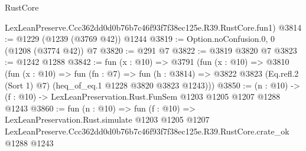 \begin{lexlean}{RustCore}
\begin{coremodule}
    LexLeanPreserve.Ccc362dd0d0b76b7c46f93f7f38ec125e.R39.RustCore.fun1)
@3814 := @1229 (@1239 (@3769 @42)) @1244
@3819 := Option.noConfusion.{0, 0} (@1208 (@3774 @42)) @7
@3820 := @291 @7
@3822 := @3819 @3820 @7
@3823 := @1242 @1288
@3842 := fun (x : @10) =>
  @3791
    (fun (x : @10) =>
    @3810
      (fun (x : @10) =>
      fun (fn : @7) =>
      fun (h : @3814) =>
      @3822 @3823 (Eq.refl.{2} (Sort 1) @7) (heq_of_eq.{1} @1228 @3820 @3823 @1243)))
@3850 := (n : @10) -> (f : @10) -> LexLeanPreservation.Rust.FunSem @1203 @1205 @1207 @1288 @1243
@3860 := fun (n : @10) =>
  fun (f : @10) =>
  LexLeanPreservation.Rust.simulate
    @1203
    @1205
    @1207
    LexLeanPreserve.Ccc362dd0d0b76b7c46f93f7f38ec125e.R39.RustCore.crate_ok
    @1288
    @1243
\end{coremodule}
\end{lexlean}
